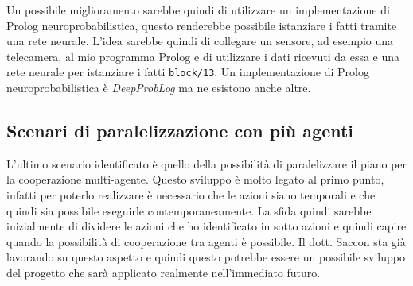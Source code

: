 Un possibile miglioramento sarebbe quindi di utilizzare un implementazione di Prolog neuroprobabilistica, questo renderebbe possibile istanziare i fatti tramite una rete neurale.
L'idea sarebbe quindi di collegare un sensore, ad esempio una telecamera, al mio programma Prolog e di utilizzare i dati ricevuti da essa e una rete neurale per istanziare i fatti \verb+block/13+.
Un implementazione di Prolog neuroprobabilistica è \textit{DeepProbLog} \cite{MANHAEVE2021103504} ma ne esistono anche altre.

\subsection*{Scenari di paralelizzazione con più agenti}
\label{subsec:parallel}
L'ultimo scenario identificato è quello della possibilità di paralelizzare il piano per la cooperazione multi-agente.
Questo sviluppo è molto legato al primo punto, infatti per poterlo realizzare è necessario che le azioni siano temporali e che quindi sia possibile eseguirle contemporaneamente.
La sfida quindi sarebbe inizialmente di dividere le azioni che ho identificato in sotto azioni e quindi capire quando la possibilità di cooperazione tra agenti è possibile. 
Il dott. Saccon sta già lavorando su questo aspetto e quindi questo potrebbe essere un possibile sviluppo del progetto che sarà applicato realmente nell'immediato futuro.
